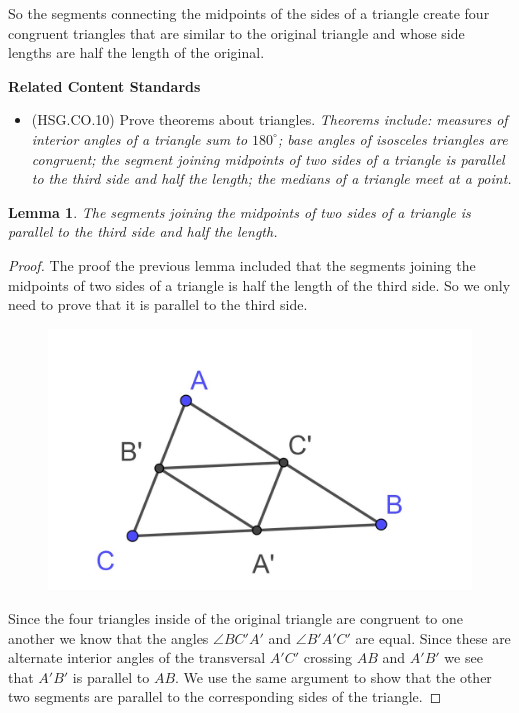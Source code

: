 \documentclass[
]{book}
\providecommand{\tightlist}{%
  \setlength{\itemsep}{0pt}\setlength{\parskip}{0pt}}
\newenvironment{standards}{}{}
\newtheorem{lemma}{Lemma}[chapter]
\theoremstyle{definition}
\theoremstyle{definition}
\theoremstyle{definition}
\theoremstyle{definition}
\theoremstyle{remark}
\begin{document}
So the segments connecting the midpoints of the sides of a triangle create four congruent triangles that are similar to the original triangle and whose side lengths are half the length of the original.

\begin{standards}

\begin{center}
\textbf{Related Content Standards}

\end{center}

\begin{itemize}
\tightlist
\item
  (HSG.CO.10) Prove theorems about triangles. \emph{Theorems include: measures of interior angles of a triangle sum to \(180^\circ\); base angles of isosceles triangles are congruent; the segment joining midpoints of two sides of a triangle is parallel to the third side and half the length; the medians of a triangle meet at a point.}
\end{itemize}

\end{standards}

\begin{lemma}
The segments joining the midpoints of two sides of a triangle is parallel to the third side and half the length.
\end{lemma}

\begin{proof}
The proof the previous lemma included that the segments joining the midpoints of two sides of a triangle is half the length of the third side. So we only need to prove that it is parallel to the third side.

\begin{figure}

{\centering \includegraphics[width=0.3\linewidth]{images/midpoint-triangle-similarity} 

}

\end{figure}

Since the four triangles inside of the original triangle are congruent to one another we know that the angles \(\angle BC'A'\) and \(\angle B'A'C'\) are equal. Since these are alternate interior angles of the transversal \(A'C'\) crossing \(AB\) and \(A'B'\) we see that \(A'B'\) is parallel to \(AB\). We use the same argument to show that the other two segments are parallel to the corresponding sides of the triangle.
\end{proof}
\end{document}
